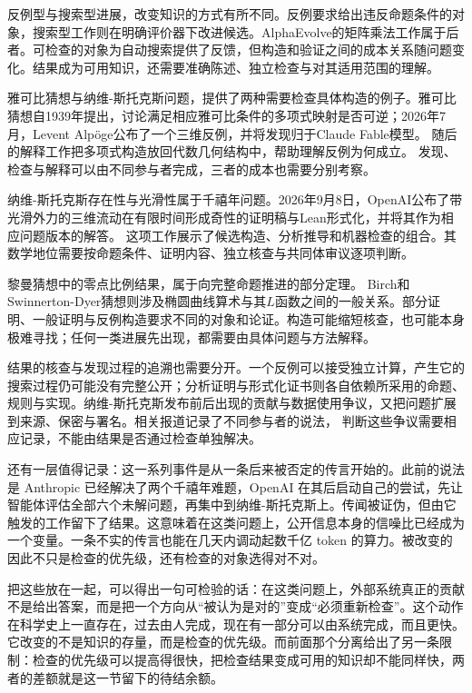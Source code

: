反例型与搜索型进展，改变知识的方式有所不同。反例要求给出违反命题条件的对象，搜索型工作则在明确评价器下改进候选。AlphaEvolve的矩阵乘法工作属于后者。可检查的对象为自动搜索提供了反馈，但构造和验证之间的成本关系随问题变化。结果成为可用知识，还需要准确陈述、独立检查与对其适用范围的理解。

雅可比猜想与纳维-斯托克斯问题，提供了两种需要检查具体构造的例子。雅可比猜想自1939年提出，讨论满足相应雅可比条件的多项式映射是否可逆；2026年7月，Levent Alp\"oge公布了一个三维反例，并将发现归于Claude Fable模型。\cite{alpoge2026jacobian} 随后的解释工作把多项式构造放回代数几何结构中，帮助理解反例为何成立。\cite{tao2026jacobiandigestion} 发现、检查与解释可以由不同参与者完成，三者的成本也需要分别考察。

纳维-斯托克斯存在性与光滑性属于千禧年问题。2026年9月8日，OpenAI公布了带光滑外力的三维流动在有限时间形成奇性的证明稿与Lean形式化，并将其作为相应问题版本的解答。\cite{openai2026navierstokes} 这项工作展示了候选构造、分析推导和机器检查的组合。其数学地位需要按命题条件、证明内容、独立核查与共同体审议逐项判断。

黎曼猜想中的零点比例结果，属于向完整命题推进的部分定理。\cite{anthropic2026riemann,lamzouri2026} Birch和Swinnerton-Dyer猜想则涉及椭圆曲线算术与其$L$函数之间的一般关系。部分证明、一般证明与反例构造要求不同的对象和论证。构造可能缩短核查，也可能本身极难寻找；任何一类进展先出现，都需要由具体问题与方法解释。

结果的核查与发现过程的追溯也需要分开。一个反例可以接受独立计算，产生它的搜索过程仍可能没有完整公开；分析证明与形式化证书则各自依赖所采用的命题、规则与实现。纳维-斯托克斯发布前后出现的贡献与数据使用争议，又把问题扩展到来源、保密与署名。相关报道记录了不同参与者的说法，\cite{axios2026mathcredit,techcrunch2026buckmaster,venturebeat2026codexdata} 判断这些争议需要相应记录，不能由结果是否通过检查单独解决。

还有一层值得记录：这一系列事件是从一条后来被否定的传言开始的。此前的说法是 Anthropic 已经解决了两个千禧年难题，OpenAI 在其后启动自己的尝试，先让智能体评估全部六个未解问题，再集中到纳维-斯托克斯上。传闻被证伪，但由它触发的工作留下了结果。这意味着在这类问题上，公开信息本身的信噪比已经成为一个变量。一条不实的传言也能在几天内调动起数千亿 token 的算力。被改变的因此不只是检查的优先级，还有检查的对象选得对不对。

把这些放在一起，可以得出一句可检验的话：在这类问题上，外部系统真正的贡献不是给出答案，而是把一个方向从“被认为是对的”变成“必须重新检查”。这个动作在科学史上一直存在，过去由人完成，现在有一部分可以由系统完成，而且更快。它改变的不是知识的存量，而是检查的优先级。而前面那个分离给出了另一条限制：检查的优先级可以提高得很快，把检查结果变成可用的知识却不能同样快，两者的差额就是这一节留下的待结余额。

